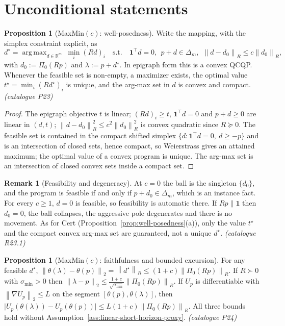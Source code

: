 \documentclass[12pt,a4paper]{report}
\newcommand{\R}{\mathbb{R}}
\newcommand{\1}{\mathbf{1}}
\newcommand{\norm}[1]{\left\lVert #1 \right\rVert}
\newcommand{\Pz}{\Pi_{0}}
\DeclareMathOperator*{\argmax}{arg\,max}
\theoremstyle{definition}
\newtheorem{remark}[definition]{Remark}
\newtheorem{proposition}[definition]{Proposition}
\begin{document}
\section{Unconditional statements}

\begin{proposition}[MaxMin\((c)\): well-posedness]
\label{prop:maxmin-wellposed}
Write the mapping, with the simplex constraint explicit, as
\[
d^\star=\argmax_{d\in\R^m}\ \min_i (Rd)_i
\quad\text{s.t.}\quad
\1^\top d=0,\ \ p+d\in\Delta_m,\ \ \norm{d-d_0}_R\le c\norm{d_0}_R,
\]
with \(d_0:=\Pz(Rp)\) and \(\lambda:=p+d^\star\). In epigraph form this is a convex QCQP. Whenever the feasible set is non-empty, a maximizer exists, the optimal value \(t^\star=\min_i(Rd^\star)_i\) is unique, and the arg-max set in \(d\) is convex and compact. \emph{(catalogue P23)}
\end{proposition}

\begin{proof}
The epigraph objective \(t\) is linear; \((Rd)_i\ge t\), \(\1^\top d=0\) and \(p+d\ge0\) are linear in \((d,t)\); \(\norm{d-d_0}_R^2\le c^2\norm{d_0}_R^2\) is convex quadratic since \(R\succeq0\). The feasible set is contained in the compact shifted simplex \(\{d:\1^\top d=0,\ d\ge-p\}\) and is an intersection of closed sets, hence compact, so Weierstrass gives an attained maximum; the optimal value of a convex program is unique. The arg-max set is an intersection of closed convex sets inside a compact set.
\end{proof}

\begin{remark}[Feasibility and degeneracy]
\label{rem:maxmin-feasibility}
At \(c=0\) the ball is the singleton \(\{d_0\}\), and the program is feasible if and only if \(p+d_0\in\Delta_m\), which is an instance fact. For every \(c\ge1\), \(d=0\) is feasible, so feasibility is automatic there. If \(Rp\parallel\1\) then \(d_0=0\), the ball collapses, the aggressive pole degenerates and there is no movement. As for Cert (Proposition~\ref{prop:well-posedness}(a)), only the value \(t^\star\) and the compact convex arg-max set are guaranteed, not a unique \(d^\star\). \emph{(catalogue R23.1)}
\end{remark}

\begin{proposition}[MaxMin\((c)\): faithfulness and bounded excursion]
\label{prop:maxmin-faithfulness}
For any feasible \(d^\star\), \(\norm{\theta(\lambda)-\theta(p)}_2=\norm{d^\star}_R\le(1+c)\norm{\Pz(Rp)}_R\). If \(R\succ0\) with \(\sigma_{\min}>0\) then \(\norm{\lambda-p}_2\le\tfrac{1+c}{\sqrt{\sigma_{\min}}}\norm{\Pz(Rp)}_R\). If \(U_p\) is differentiable with \(\norm{\nabla U_p}_2\le L\) on the segment \([\theta(p),\theta(\lambda)]\), then \(\lvert U_p(\theta(\lambda))-U_p(\theta(p))\rvert\le L(1+c)\norm{\Pz(Rp)}_R\). All three bounds hold without Assumption~\ref{ass:linear-short-horizon-proxy}. \emph{(catalogue P24)}
\end{proposition}
\end{document}
